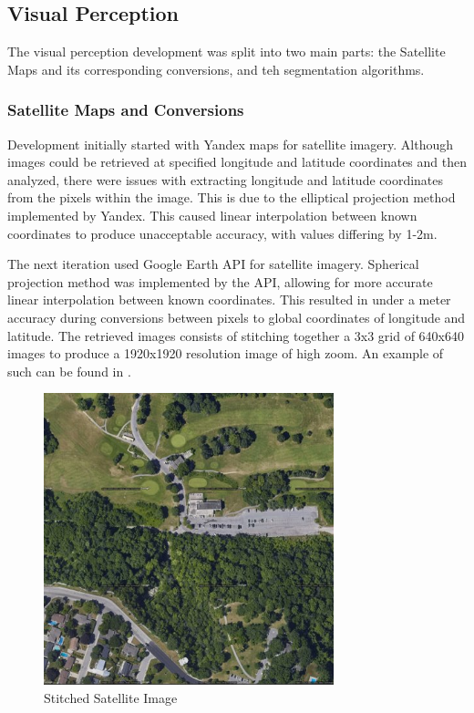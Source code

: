 \documentclass{article}
\begin{document}
\clearpage

\subsection{Visual Perception}
The visual perception development was split into two main parts: the Satellite Maps and its corresponding conversions, and teh segmentation algorithms.

\subsubsection{Satellite Maps and Conversions}
Development initially started with Yandex maps for satellite imagery. Although images could be retrieved at specified longitude and latitude coordinates and then analyzed, there were issues with extracting longitude and latitude coordinates from the pixels within the image. This is due to the elliptical projection method implemented by Yandex. This caused linear interpolation between known coordinates to produce unacceptable accuracy, with values differing by 1-2m.

The next iteration used Google Earth API for satellite imagery. Spherical projection method was implemented by the API, allowing for more accurate linear interpolation between known coordinates. This resulted in under a meter accuracy during conversions between pixels to global coordinates of longitude and latitude. The retrieved images consists of stitching together a 3x3 grid of 640x640 images to produce a 1920x1920 resolution image of high zoom. An example of such can be found in .

\begin{figure}[h!]
  \begin{center} 
  \caption{Stitched Satellite Image}
  \label{fig:StitchedImage}
        \includegraphics[width=0.75\textwidth]{Reflection/StitchedImage.png}
  \end{center}
\end{figure}
\end{document}

